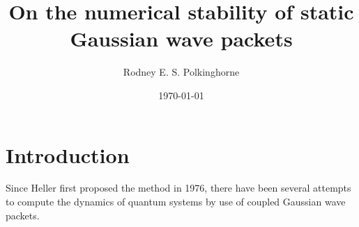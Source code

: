 \documentclass[aip,jcp,graphicx,draft]{revtex4-1}
\begin{document}

\title{On the numerical stability of static Gaussian wave packets} %



\author{Rodney E. S. Polkinghorne}


\date{\today}

\begin{abstract}
\end{abstract}

\pacs{}%

\maketitle %

\section{Introduction}

Since Heller first proposed the method in 1976\cite{jcp-64-63}, there have been several attempts to compute the dynamics of quantum systems by use of coupled Gaussian wave packets.
\end{document}
